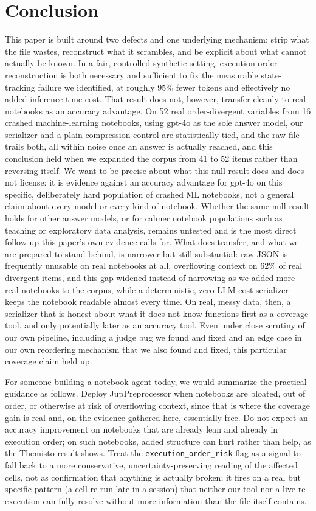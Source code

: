 \documentclass[11pt]{article}
\begin{document}
\section{Conclusion}
This paper is built around two defects and one underlying mechanism:
strip what the file wastes, reconstruct what it scrambles, and be
explicit about what cannot actually be known. In a fair, controlled
synthetic setting, execution-order reconstruction is both necessary and
sufficient to fix the measurable state-tracking failure we identified, at
roughly 95\% fewer tokens and effectively no added inference-time cost.
That result does not, however, transfer cleanly to real notebooks as an
accuracy advantage. On 52 real order-divergent variables from 16
crashed machine-learning notebooks, using gpt-4o as the sole answer
model, our serializer and a plain compression control are statistically
tied, and the raw file trails both, all within noise once an answer is
actually reached, and this conclusion held when we expanded the corpus
from 41 to 52 items rather than reversing itself. We want to be precise
about what this null result does and does not license: it is evidence
against an accuracy advantage for gpt-4o on this specific, deliberately
hard population of crashed ML notebooks, not a general claim about every
model or every kind of notebook. Whether the same null result holds for
other answer models, or for calmer notebook populations such as teaching
or exploratory data analysis, remains untested and is the most direct
follow-up this paper's own evidence calls for. What does transfer, and what we are
prepared to stand behind, is narrower but still substantial: raw JSON is
frequently unusable on real notebooks at all, overflowing context on 62\%
of real divergent items, and this gap widened instead of narrowing as we added
more real notebooks to the corpus, while a deterministic, zero-LLM-cost
serializer keeps the notebook readable almost every time. On real, messy
data, then, a serializer that is honest about what it does not know
functions first as a coverage tool, and only potentially later as an
accuracy tool. Even under close scrutiny of our own pipeline, including a
judge bug we found and fixed and an edge case in our own reordering
mechanism that we also found and fixed, this particular coverage claim
held up.

For someone building a notebook agent today, we would summarize the
practical guidance as follows. Deploy JupPreprocessor when notebooks are
bloated, out of order, or otherwise at risk of overflowing context,
since that is where the coverage gain is real and, on the evidence
gathered here, essentially free. Do not expect an accuracy improvement
on notebooks that are already lean and already in execution order; on
such notebooks, added structure can hurt rather than help, as the
Themisto result shows. Treat the \texttt{execution\_order\_risk} flag as
a signal to fall back to a more conservative, uncertainty-preserving
reading of the affected cells, not as confirmation that anything is
actually broken; it fires on a real but specific pattern (a cell re-run
late in a session) that neither our tool nor a live re-execution can
fully resolve without more information than the file itself contains.
\end{document}
